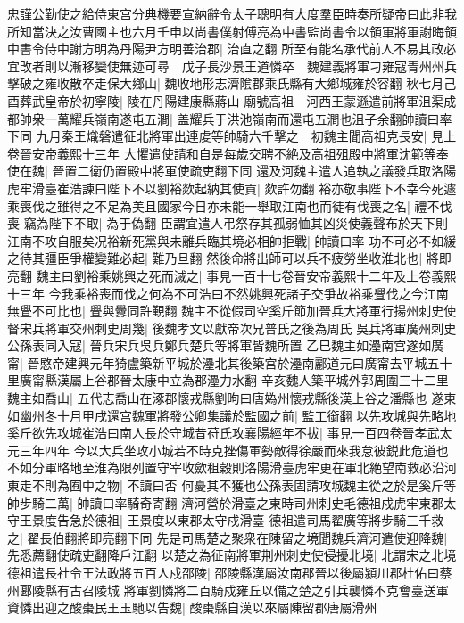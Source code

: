 忠謹公勤使之給侍東宫分典機要宣納辭令太子聰明有大度羣臣時奏所疑帝曰此非我所知當決之汝曹國主也六月壬申以尚書僕射傅亮為中書監尚書令以領軍將軍謝晦領中書令侍中謝方明為丹陽尹方明善治郡|{
	治直之翻}
所至有能名承代前人不易其政必宜改者則以漸移變使無迹可尋　戊子長沙景王道憐卒　魏建義將軍刁雍寇青州州兵擊破之雍收散卒走保大鄉山|{
	魏收地形志濟隂郡乘氏縣有大鄉城雍於容翻}
秋七月己酉葬武皇帝於初寧陵|{
	陵在丹陽建康縣蔣山}
廟號高祖　河西王蒙遜遣前將軍沮渠成都帥衆一萬耀兵嶺南遂屯五澗|{
	盖耀兵于洪池嶺南而還屯五澗也沮子余翻帥讀曰率下同}
九月秦王熾磐遣征北將軍出連䖍等帥騎六千擊之　初魏主聞高祖克長安|{
	見上卷晉安帝義熙十三年}
大懼遣使請和自是每歲交聘不絶及高祖殂殿中將軍沈範等奉使在魏|{
	晉置二衛仍置殿中將軍使疏吏翻下同}
還及河魏主遣人追執之議發兵取洛陽虎牢滑臺崔浩諫曰陛下不以劉裕欻起納其使貢|{
	欻許勿翻}
裕亦敬事陛下不幸今死遽乘喪伐之雖得之不足為美且國家今日亦未能一舉取江南也而徒有伐喪之名|{
	禮不伐喪}
竊為陛下不取|{
	為于偽翻}
臣謂宜遣人弔祭存其孤弱恤其凶災使義聲布於天下則江南不攻自服矣况裕新死黨與未離兵臨其境必相帥拒戰|{
	帥讀曰率}
功不可必不如緩之待其彊臣爭權變難必起|{
	難乃旦翻}
然後命將出師可以兵不疲勞坐收淮北也|{
	將即亮翻}
魏主曰劉裕乘姚興之死而滅之|{
	事見一百十七卷晉安帝義熙十二年及上卷義熙十三年}
今我乘裕喪而伐之何為不可浩曰不然姚興死諸子交爭故裕乘舋伐之今江南無舋不可比也|{
	舋與釁同許覲翻}
魏主不從假司空奚斤節加晉兵大將軍行揚州刺史使督宋兵將軍交州刺史周幾|{
	後魏孝文以獻帝次兄普氏之後為周氏}
吳兵將軍廣州刺史公孫表同入寇|{
	晉兵宋兵吳兵鄭兵楚兵等將軍皆魏所置}
乙巳魏主如灅南宫遂如廣甯|{
	晉愍帝建興元年猗盧築新平城於灅北其後築宫於灅南酈道元曰廣甯去平城五十里廣甯縣漢屬上谷郡晉太康中立為郡灅力水翻}
辛亥魏人築平城外郭周圍三十二里　魏主如喬山|{
	五代志喬山在涿郡懷戎縣劉昫曰唐媯州懷戎縣後漢上谷之潘縣也}
遂東如幽州冬十月甲戌還宫魏軍將發公卿集議於監國之前|{
	監工銜翻}
以先攻城與先略地奚斤欲先攻城崔浩曰南人長於守城昔苻氏攻襄陽經年不拔|{
	事見一百四卷晉孝武太元三年四年}
今以大兵坐攻小城若不時克挫傷軍勢敵得徐嚴而來我怠彼鋭此危道也不如分軍略地至淮為限列置守宰收歛租穀則洛陽滑臺虎牢更在軍北絶望南救必沿河東走不則為囿中之物|{
	不讀曰否}
何憂其不獲也公孫表固請攻城魏主從之於是奚斤等帥步騎二萬|{
	帥讀曰率騎奇寄翻}
濟河營於滑臺之東時司州刺史毛德祖戍虎牢東郡太守王景度告急於德祖|{
	王景度以東郡太守戍滑臺}
德祖遣司馬翟廣等將步騎三千救之|{
	翟長伯翻將即亮翻下同}
先是司馬楚之聚衆在陳留之境聞魏兵濟河遣使迎降魏|{
	先悉薦翻使疏吏翻降戶江翻}
以楚之為征南將軍荆州刺史使侵擾北境|{
	北謂宋之北境}
德祖遣長社令王法政將五百人戍邵陵|{
	邵陵縣漢屬汝南郡晉以後屬潁川郡杜佑曰蔡州郾陵縣有古召陵城}
將軍劉憐將二百騎戍雍丘以備之楚之引兵襲憐不克會臺送軍資憐出迎之酸棗民王玉馳以告魏|{
	酸棗縣自漢以來屬陳留郡唐屬滑州}
